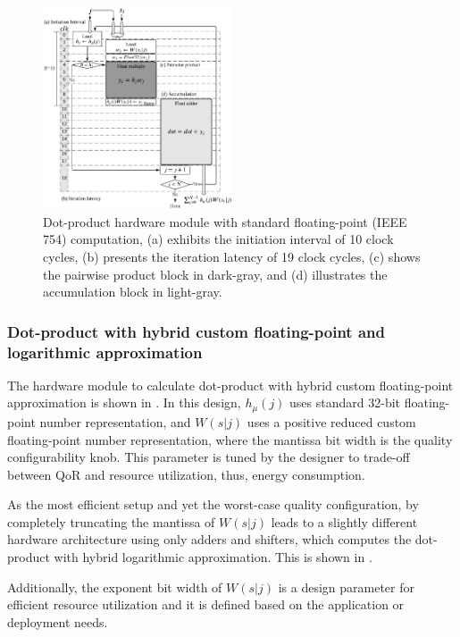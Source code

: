 \begin{figure}[t!]
	\centering
	\includegraphics[width=0.5\textwidth]{../figures/dot_product_float.pdf}
	\caption{Dot-product hardware module with standard floating-point (IEEE 754) computation, (a) exhibits the initiation interval of 10 clock cycles, (b) presents the iteration latency of 19 clock cycles, (c) shows the pairwise product block in dark-gray, and (d) illustrates the accumulation block in light-gray.}
	\label{fig:dot_product_float}
\end{figure}

\subsubsection{Dot-product with hybrid custom floating-point and logarithmic approximation}
 The hardware module to calculate dot-product with hybrid custom floating-point approximation is shown in . In this design, $h_\mu(j)$ uses standard 32-bit floating-point number representation, and $W(s|j)$ uses a positive reduced custom floating-point number representation, where the mantissa bit width is the quality configurability knob. This parameter is tuned by the designer to trade-off between QoR and resource utilization, thus, energy consumption.
 
 As the most efficient setup and yet the worst-case quality configuration, by completely truncating the mantissa of $W(s|j)$ leads to a slightly different hardware architecture using only adders and shifters, which computes the dot-product with hybrid logarithmic approximation. This is shown in .
 
Additionally, the exponent bit width of $W(s|j)$ is a design parameter for efficient resource utilization and it is defined based on the application or deployment needs.
 
